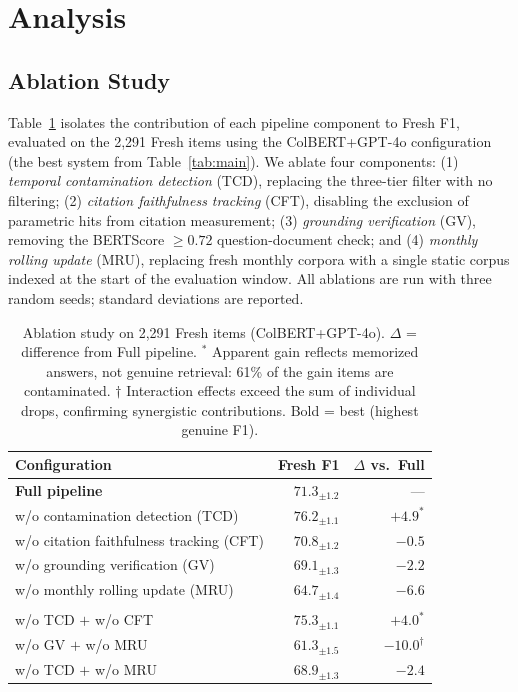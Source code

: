 \section{Analysis}
\label{sec:analysis}

\subsection{Ablation Study}

Table~\ref{tab:ablation} isolates the contribution of each \method{} pipeline component to Fresh F1, evaluated on the 2,291 Fresh items using the ColBERT+GPT-4o configuration (the best system from Table~\ref{tab:main}). We ablate four components: (1) \emph{temporal contamination detection} (TCD), replacing the three-tier filter with no filtering; (2) \emph{citation faithfulness tracking} (CFT), disabling the exclusion of parametric hits from citation measurement; (3) \emph{grounding verification} (GV), removing the BERTScore $\geq 0.72$ question-document check; and (4) \emph{monthly rolling update} (MRU), replacing fresh monthly corpora with a single static corpus indexed at the start of the evaluation window. All ablations are run with three random seeds; standard deviations are reported.

\begin{table}[t]
\centering
\small
\caption{Ablation study on 2,291 Fresh items (ColBERT+GPT-4o). $\Delta$ = difference from Full pipeline. $^*$ Apparent gain reflects memorized answers, not genuine retrieval: 61\% of the gain items are contaminated. $\dagger$ Interaction effects exceed the sum of individual drops, confirming synergistic contributions. Bold = best (highest genuine F1).}
\label{tab:ablation}
\begin{tabular}{lrr}
\toprule
Configuration & Fresh F1 & $\Delta$ vs.\ Full \\
\midrule
\textbf{Full \method{} pipeline}              & $\mathbf{71.3_{\pm 1.2}}$ & --- \\
\quad w/o contamination detection (TCD)       & $76.2_{\pm 1.1}$ & $+4.9^*$ \\
\quad w/o citation faithfulness tracking (CFT) & $70.8_{\pm 1.2}$ & $-0.5$ \\
\quad w/o grounding verification (GV)         & $69.1_{\pm 1.3}$ & $-2.2$ \\
\quad w/o monthly rolling update (MRU)        & $64.7_{\pm 1.4}$ & $-6.6$ \\
\addlinespace
\multicolumn{3}{l}{\textit{Two-component ablations:}} \\
\quad w/o TCD $+$ w/o CFT                    & $75.3_{\pm 1.1}$ & $+4.0^*$ \\
\quad w/o GV $+$ w/o MRU                     & $61.3_{\pm 1.5}$ & $-10.0^{\dagger}$ \\
\quad w/o TCD $+$ w/o MRU                    & $68.9_{\pm 1.3}$ & $-2.4$ \\
\bottomrule
\end{tabular}
\end{table}


